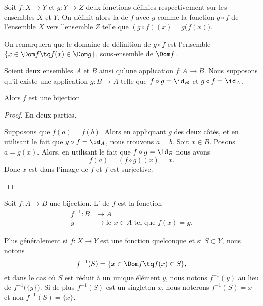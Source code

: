 \begin{definition}  \label{DEFcomposeeFonctions}
	Soit \( f: X \to Y \) et \( g: Y \to Z \) deux fonctions définies respectivement sur les ensembles \( X \) et \( Y \). On définit alors la  de \( f \) avec \( g \) comme la fonction \( g \circ f \) de l'ensemble \( X \) vers l'ensemble \( Z \) telle que \( (g \circ f) (x) = g\bigl(f(x)\bigr) \).

	On remarquera que le domaine de définition de \( g \circ f \) est l'ensemble \( \{ x \in \Dom f \tq f(x) \in \Dom g\}\), sous-ensemble de \( \Dom f \).
\end{definition}

\begin{lemma}       \label{LEMooWBYSooFqyqQP}
	Soient deux ensembles \( A\) et \( B\) ainsi qu'une application \( f\colon A\to B\). Nous supposons qu'il existe une application \( g\colon B\to A\) telle que \( f\circ g=\id_B\) et \( g\circ f=\id_A\).

	Alors \( f\) est une bijection.
\end{lemma}

\begin{proof}
	En deux parties.
	\begin{subproof}
		\spitem[Injection]
		Supposons que \( f(a)=f(b)\). Alors en appliquant \( g\) des deux côtés, et en utilisant le fait que \( g\circ f=\id_A\), nous trouvons \( a=b\).
		\spitem[Surjection]
		Soit \( x\in B\). Posons \( a=g(x)\). Alors, en utilisant le fait que \( f\circ g=\id_B\) nous avons
		\begin{equation}
			f(a)=(f\circ g)(x)=x.
		\end{equation}
		Donc \( x\) est dans l'image de \( f\) et \( f\) est surjective.
	\end{subproof}
\end{proof}

\begin{definition}      \label{DEFooTRGYooRxORpY}
	Soit \( f\colon A\to B\) une bijection. L' de \( f\) est la fonction
	\begin{equation}
		\begin{aligned}
			f^{-1}\colon B & \to A                                             \\
			y              & \mapsto \text{le } x\in A\text{ tel que } f(x)=y.
		\end{aligned}
	\end{equation}

	Plus généralement si \( f\colon X\to Y\) est une fonction quelconque et si \( S\subset Y\), nous notons
	\begin{equation}
		f^{-1}(S)=\{ x\in \Dom f \tq f(x)\in S \},
	\end{equation}
	et dans le cas où \( S\) est réduit à un unique élément \( y\), nous notons \( f^{-1}(y)\) au lieu de \( f^{-1}\big( \{ y \} \big)\). Si de plus \( f^{-1}(S)\) est un singleton \( x\), nous noterons \( f^{-1}(S)=x\) et non \( f^{-1}(S)=\{ x \}\).
\end{definition}

